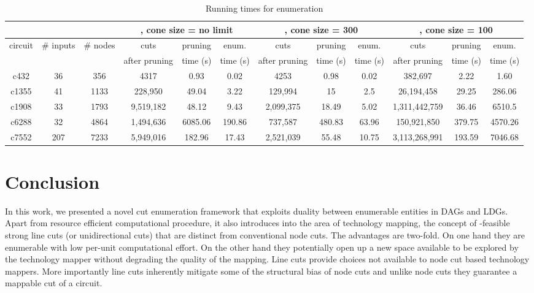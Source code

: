 \documentclass[journal]{IEEEtran}
\begin{document}
\begin{table*}[t]
\caption{Running times for enumeration}
\label{tab:enumreduced}
\def\thefootnote{a}\footnotesize
\centering
\begin{tabular}{|c|c|c|c|c|c|c|c|c|c|c|c|}
\cline{1-12}
& & & \multicolumn{3}{|c|}{, cone size = no limit}& \multicolumn{3}{|c|}{, cone size = 300}&\multicolumn{3}{|c|}{, cone size = 100}\\ \hline
{circuit} & {\# inputs} & {\# nodes} & {cuts} & pruning & enum.& {cuts} & {pruning} & enum. & {cuts} & {pruning} & enum.\\
             &                &              & after pruning& time (s) & time (s) & after pruning & time (s) & time (s) & after pruning & time (s) & time (s)\\ \hline
c432 & 36 & 356 & 4317 & 0.93 & 0.02 & 4253 & 0.98 & 0.02 & 382,697 & 2.22 & 1.60\\ \hline
c1355 & 41 & 1133 & 228,950 & 49.04 & 3.22  & 129,994 & 15 & 2.5 & 26,194,458 & 29.25 & 286.06\\ \hline
c1908 & 33 & 1793  & 9,519,182 & 48.12 & 9.43 & 2,099,375 & 18.49 & 5.02 & 1,311,442,759 & 36.46 & 6510.5 \\ \hline
c6288 & 32 & 4864  & 1,494,636 & 6085.06 & 190.86 & 737,587 & 480.83 & 63.96 & 150,921,850 & 379.75 & 4570.26 \\ \hline
c7552 & 207 & 7233  & 5,949,016 & 182.96 & 17.43 & 2,521,039 & 55.48 & 10.75 & 3,113,268,991 & 193.59 & 7046.68 \\ \hline
\end{tabular}
\end{table*}



\section{Conclusion}

In this work, we presented a novel cut enumeration framework that exploits duality between enumerable entities in DAGs and LDGs. Apart from resource efficient computational procedure, it also introduces into the area of technology mapping, the concept of -feasible strong line cuts (or unidirectional cuts) that are distinct from conventional node cuts. The advantages are two-fold. On one hand they are enumerable with low per-unit computational effort. On the other hand they potentially open up a new space available to be explored by the technology mapper without degrading the quality of the mapping. Line cuts provide choices not available to node cut based technology mappers. More importantly line cuts inherently mitigate some of the structural bias of node cuts and unlike node cuts they guarantee a mappable cut of a circuit.
\end{document}
